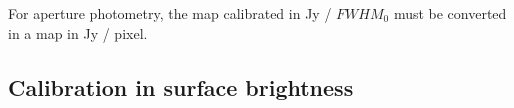 For aperture photometry, the map calibrated in Jy / $FWHM_{0}$ must be
converted in a map in Jy / pixel. 

\subsection{Calibration in surface brightness}





 

%
%
%
